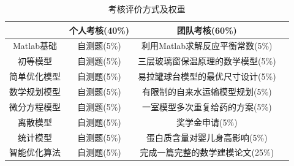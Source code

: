 \documentclass[10pt]{elegantnote}
\begin{document}
\begin{sloppypar}
\begin{table}[htpb]
    \centering
    \caption{考核评价方式及权重}
    \begin{tabular}{cccc}
        \bottomrule
        & 个人考核(40\%) & 团队考核(60\%) &  \\ \hline
        Matlab基础 & 自测题(5\%) & 利用Matlab求解反应平衡常数(5\%) &  \\ \hline
        初等模型 & 自测题(5\%) & 三层玻璃窗保温原理的数学模型(5\%) &  \\ \hline
        简单优化模型 & 自测题(5\%) & 易拉罐球台模型的最优尺寸设计(5\%) &  \\ \hline
        数学规划模型 & 自测题(5\%) & 有限制的自来水运输模型规划(5\%) &  \\ \hline
        微分方程模型 & 自测题(5\%) & 一室模型多次重复给药的方案(5\%) &  \\ \hline
        离散模型 & 自测题(5\%) & 奖学金申请(5\%) &  \\ \hline
        统计模型 & 自测题(5\%) & 蛋白质含量对婴儿身高影响(5\%) &  \\ \hline
        智能优化算法 & 自测题(5\%) & 完成一篇完整的数学建模论文(25\%) &  \\ \toprule
    \end{tabular}
\end{table}










\end{sloppypar}
\end{document}
